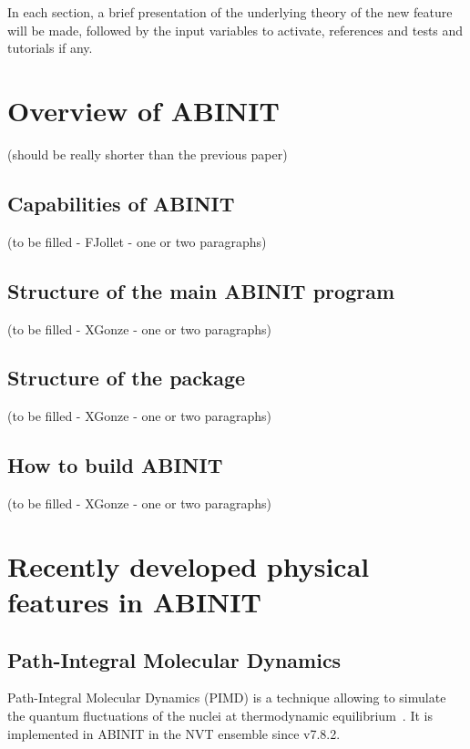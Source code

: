 \documentclass{elsart}
\begin{document}
In each section, a brief presentation of the underlying theory of the new feature will be made, followed by the input variables to activate, references and tests and tutorials if any. 



\newpage

\section{Overview of ABINIT}

(should be really shorter than the previous paper)

\subsection{Capabilities of ABINIT}

(to be filled - FJollet - one or two paragraphs)

\subsection{Structure of the main ABINIT program}

(to be filled - XGonze - one or two paragraphs)

\subsection{Structure of the package}
(to be filled - XGonze - one or two paragraphs)

\subsection{How to build ABINIT}
(to be filled - XGonze - one or two paragraphs)


\newpage

\section{Recently developed physical features in ABINIT}

\subsection{Path-Integral Molecular Dynamics}




Path-Integral Molecular Dynamics (PIMD) is a technique allowing to simulate the quantum fluctuations of the nuclei
at thermodynamic equilibrium~\cite{Marx96}. It is implemented in ABINIT in the NVT ensemble since v7.8.2.
\end{document}
